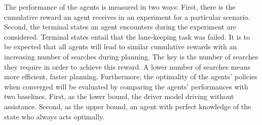 The performance of the agents is measured in two ways: First, there is the cumulative reward an agent receives in an experiment for a particular scenario. Second, the terminal states an agent encounters during the experiment are considered. Terminal states entail that the lane-keeping task was failed. It is to be expected that all agents will lead to similar cumulative rewards with an increasing number of searches during planning. The key is the number of searches they require in order to achieve this reward. A lower number of searches means more efficient, faster planning. Furthermore, the optimality of the agents' policies when converged will be evaluated by comparing the agents' performances with two baselines. First, as the lower bound, the driver model driving without assistance. Second, as the upper bound, an agent with perfect knowledge of the state who always acts optimally.

